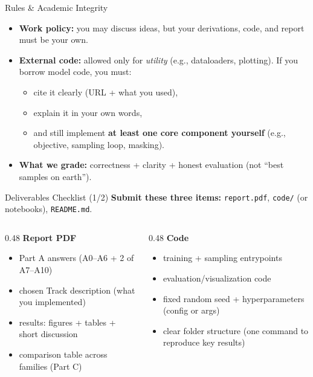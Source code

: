 \documentclass[aspectratio=169]{beamer}
\begin{document}
\begin{frame}{Rules \& Academic Integrity}
\small
\begin{itemize}
  \item \textbf{Work policy:} you may discuss ideas, but your derivations, code, and report must be your own.
  \item \textbf{External code:} allowed only for \emph{utility} (e.g., dataloaders, plotting). If you borrow model code, you must:
  \begin{itemize}
    \item cite it clearly (URL + what you used),
    \item explain it in your own words,
    \item and still implement \textbf{at least one core component yourself} (e.g., objective, sampling loop, masking).
  \end{itemize}
  \item \textbf{What we grade:} correctness + clarity + honest evaluation (not ``best samples on earth'').
\end{itemize}
\end{frame}

\begin{frame}{Deliverables Checklist (1/2)}
\scriptsize
\textbf{Submit these three items:} \texttt{report.pdf}, \texttt{code/} (or notebooks), \texttt{README.md}.
\vspace{0.5em}

\begin{columns}[T,onlytextwidth]
\begin{column}{0.48\textwidth}
\textbf{Report PDF}
\begin{itemize}
  \item Part A answers (A0--A6 + 2 of A7--A10)
  \item chosen Track description (what you implemented)
  \item results: figures + tables + short discussion
  \item comparison table across families (Part C)
\end{itemize}
\end{column}
\begin{column}{0.48\textwidth}
\textbf{Code}
\begin{itemize}
  \item training + sampling entrypoints
  \item evaluation/visualization code
  \item fixed random seed + hyperparameters (config or args)
  \item clear folder structure (one command to reproduce key results)
\end{itemize}
\end{column}
\end{columns}
\end{frame}
\end{document}
